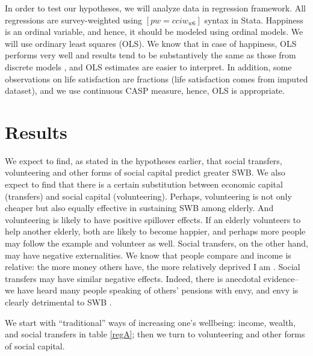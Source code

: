 \documentclass[10pt, letterpaper]{article}
\begin{document}
\begin{spacing}{1.4}
In order to test our hypotheses, we will analyze data in regression framework. 
 All regressions are survey-weighted using $[pw=cciw_{w6}]$ syntax in Stata.
Happiness is an ordinal variable, and hence, it should be modeled using ordinal
models. We will use ordinary least squares (OLS). We know that
in case of happiness, OLS performs very well and results tend to be substantively
the same as those from discrete models \citep{carbonell04,blanchflower11}, and
OLS estimates are easier to interpret.  In addition, some observations on life
satisfaction are fractions (life satisfaction comes from imputed dataset), and
we use continuous CASP measure, hence, OLS is appropriate. 


\section*{Results}


 We expect to
find, as stated in the hypotheses earlier, that social transfers, volunteering
and other forms of social capital predict greater SWB. We also expect to
find that there is a  certain substitution  between economic capital (transfers) and social
capital (volunteering). Perhaps, volunteering is not only cheaper but also  equally
effective in sustaining SWB among elderly. And volunteering is likely to have
positive spillover effects. If an elderly volunteers to help another elderly,
both are  likely to become happier, and perhaps more people may follow the
example and volunteer as well. Social transfers, on the other hand, may have
negative externalities. We know that people compare and income is relative: the
more money others have, the more relatively deprived I am
\citep{michalos85,luttmer05,bender12}. Social transfers may have similar negative
effects. Indeed, there is anecdotal evidence--we have heard many people speaking
of others' pensions with envy, and envy is clearly detrimental to SWB \citep{mujcic17}.

We start with  ``traditional'' ways of increasing one's wellbeing:
 income, wealth, and social transfers in table \ref{regA}; then we turn
to volunteering and other forms of social capital.


\end{spacing}
\end{document}

